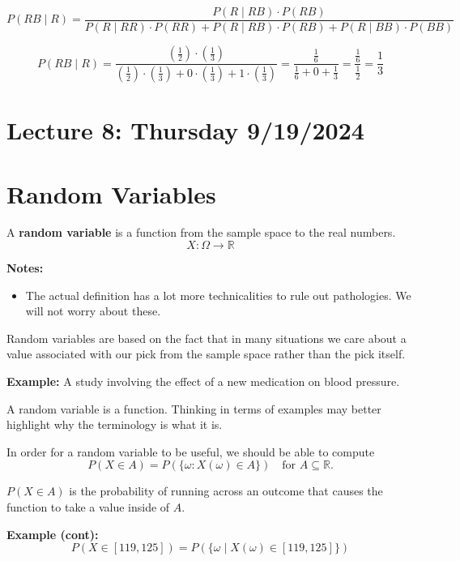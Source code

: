 \documentclass{article}
\begin{document}
    \[
        P(RB \mid R) = \frac{P(R \mid RB) \cdot P(RB)}{P(R \mid RR) \cdot P(RR) + P(R \mid RB) \cdot P(RB) + P(R \mid BB) \cdot P(BB)}
    \]

    \[
        P(RB \mid R) = \frac{\left(\frac{1}{2}\right) \cdot \left(\frac{1}{3}\right)}{\left(\frac{1}{2}\right) \cdot \left(\frac{1}{3}\right) + 0 \cdot \left(\frac{1}{3}\right) + 1 \cdot \left(\frac{1}{3}\right)} = \frac{\frac{1}{6}}{\frac{1}{6} + 0 + \frac{1}{3}} = \frac{\frac{1}{6}}{\frac{1}{2}} = \boxed{\frac{1}{3}}
    \]

    \section*{Lecture 8: Thursday 9/19/2024}

    \section*{Random Variables}

    A \textbf{random variable} is a function from the sample space to the real numbers.
    \[
        X : \Omega \to \mathbb{R}
    \]

    \textbf{Notes:}
    \begin{itemize}
        \item The actual definition has a lot more technicalities to rule out pathologies. We will not worry about these.
    \end{itemize}

    Random variables are based on the fact that in many situations we care about a value associated with our pick from the sample space rather than the pick itself.

    \textbf{Example:} A study involving the effect of a new medication on blood pressure.

    A random variable is a function. Thinking in terms of examples may better highlight why the terminology is what it is.

    In order for a random variable to be useful, we should be able to compute 
    \[
        P(X \in A) = P(\{\omega : X(\omega) \in A\}) \quad \text{for } A \subseteq \mathbb{R}.
    \]
   

    \(P(X \in A)\) is the probability of running across an outcome that causes the function to take a value inside of \(A\).

    \textbf{Example (cont):}
    \[
        P(X \in [119, 125]) = P(\{\omega \mid X(\omega) \in [119, 125]\})
    \]
\end{document}
